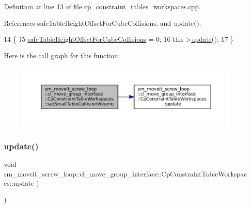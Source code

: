 Definition at line 13 of file cp\+\_\+constraint\+\_\+tables\+\_\+workspaces.\+cpp.



References safe\+Table\+Height\+Offset\+For\+Cube\+Collisions, and update().


\begin{DoxyCode}
14         \{
15             \hyperlink{classsm__moveit__screw__loop_1_1cl__move__group__interface_1_1CpConstraintTableWorkspaces_aef6283c1b9bc7b0aeb7c106b6e70a055}{safeTableHeightOffsetForCubeCollisions} = 0;
16             this->\hyperlink{classsm__moveit__screw__loop_1_1cl__move__group__interface_1_1CpConstraintTableWorkspaces_a873050debbad5977c78beb93a0b6ce77}{update}();
17         \}
\end{DoxyCode}
Here is the call graph for this function\+:
\nopagebreak
\begin{figure}[H]
\begin{center}
\leavevmode
\includegraphics[width=350pt]{classsm__moveit__screw__loop_1_1cl__move__group__interface_1_1CpConstraintTableWorkspaces_a602bb7b5acc3f249b59516ce071fd8ea_cgraph}
\end{center}
\end{figure}
\mbox{\label{classsm__moveit__screw__loop_1_1cl__move__group__interface_1_1CpConstraintTableWorkspaces_a873050debbad5977c78beb93a0b6ce77}} 
\subsubsection{\texorpdfstring{update()}{update()}}
{\footnotesize\ttfamily void sm\+\_\+moveit\+\_\+screw\+\_\+loop\+::cl\+\_\+move\+\_\+group\+\_\+interface\+::\+Cp\+Constraint\+Table\+Workspaces\+::update (\begin{DoxyParamCaption}{ }\end{DoxyParamCaption})\hspace{0.3cm}{\ttfamily [virtual]}}



